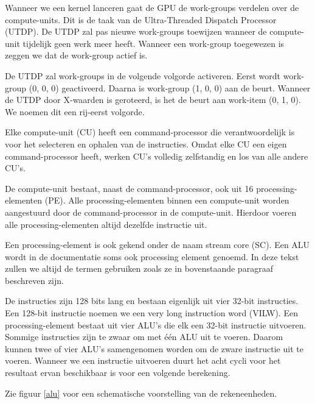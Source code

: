Wanneer we een kernel lanceren gaat de GPU de work-groups verdelen over de compute-units. Dit is de taak van de Ultra-Threaded Dispatch Processor (UTDP). De UTDP zal pas nieuwe work-groups toewijzen wanneer de compute-unit tijdelijk geen werk meer heeft.  Wanneer een work-group toegewezen is zeggen we dat de work-group actief is.

\label{WGvolg}
De UTDP zal work-groups in de volgende volgorde activeren. Eerst wordt work-group (0, 0, 0) geactiveerd. Daarna is work-group (1, 0, 0) aan de beurt. Wanneer de UTDP door X-waarden is geroteerd, is het de beurt aan work-item (0, 1, 0). We noemen dit een rij-eerst volgorde.

Elke compute-unit (CU) heeft een command-processor die verantwoordelijk is voor het selecteren en ophalen van de instructies. Omdat elke CU een eigen command-processor heeft, werken CU's volledig zelfstandig en los van alle andere CU's.

De compute-unit bestaat, naast de command-processor, ook uit 16 processing-elementen (PE). Alle processing-elementen binnen een compute-unit worden aangestuurd door de command-processor in de compute-unit. Hierdoor voeren alle processing-elementen altijd dezelfde instructie uit.

Een processing-element is ook gekend onder de naam stream core (SC). Een ALU wordt in de documentatie soms ook processing element genoemd. In deze tekst zullen we altijd de termen gebruiken zoals ze in bovenstaande paragraaf beschreven zijn.

De instructies zijn 128 bits lang en bestaan eigenlijk uit vier 32-bit instructies. Een 128-bit instructie noemen we een very long instruction word (VILW). Een processing-element bestaat uit vier ALU's die elk een 32-bit instructie uitvoeren. Sommige instructies zijn te zwaar om met \'e\'en ALU uit te voeren. Daarom kunnen twee of vier ALU's samengenomen worden om de zware instructie uit te voeren. Wanneer we een instructie uitvoeren duurt het acht cycli voor het resultaat ervan beschikbaar is voor een volgende berekening.

Zie figuur \ref{alu} voor een schematische voorstelling van de rekeneenheden.

